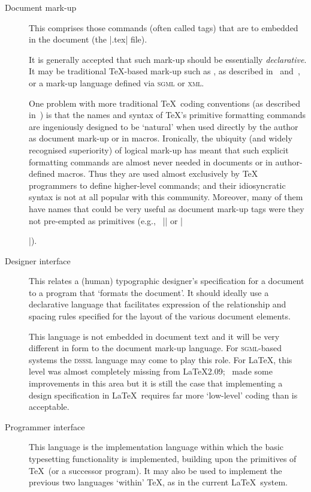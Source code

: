 \documentclass{article}
\providecommand \acro [1]{\textsc{\MakeLowercase{#1}}}
\providecommand \eg {e.g.,~}
\begin{document}
\begin{description}
\item[Document mark-up] This comprises those commands (often called tags)
  that are to embedded in the document (the |.tex| file).

  It is generally accepted that such mark-up should be essentially
  \emph{declarative}.
  It may be traditional \TeX-based mark-up such as
  \LaTeXe, as described in~\cite{A-W:LLa94} and~\cite{A-W:GMS94},
  or a mark-up language defined via \acro{SGML} or \acro{XML}.
  
  One problem with more traditional \TeX\ coding conventions (as
  described in~\cite{A-W:K-TB}) is that the names and syntax of \TeX's
  primitive formatting commands are ingeniously designed to be
  `natural' when used directly by the author as document mark-up or in
  macros.  Ironically, the ubiquity (and widely recognised
  superiority) of logical mark-up has meant that such explicit
  formatting commands are almost never needed in documents or in
  author-defined macros.  Thus they are used almost exclusively by
  \TeX{} programmers to define higher-level commands; and their
  idiosyncratic syntax is not at all popular with this community.
  Moreover, many of them have names that could be very useful as
  document mark-up tags were they not pre-empted as primitives (\eg
  |\box| or |\special|).
  
\item[Designer interface] This relates a (human) typographic
  designer's specification for a document to a program that `formats
  the document'.  It should ideally use a declarative language that
  facilitates expression of the relationship and spacing rules specified
  for the layout of the various document elements.

  This language is not embedded in document text and it will be very
  different in form to the document mark-up language.  For
  \acro{SGML}-based systems the \acro{DSSSL} language may come to play
  this role.  For \LaTeX, this level was almost completely missing
  from \LaTeX2.09; \LaTeXe\ made some improvements in this area but it
  is still the case that implementing a design specification in
  \LaTeX\ requires far more `low-level' coding than is acceptable.
\item[Programmer interface] 
  This language is the implementation
  language within which the basic typesetting functionality is
  implemented, building upon the primitives of \TeX\ (or a
  successor program).
  It may also be used to implement the previous
  two languages `within' \TeX, as in the current \LaTeX\ system.
\end{description}
\end{document}
